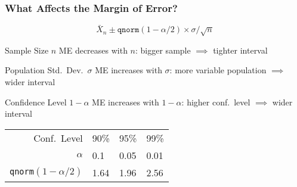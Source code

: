 \begin{frame}
\frametitle{What Affects the Margin of Error?}

	$$\boxed{\bar{X}_n \pm \texttt{qnorm}(1-\alpha/2) \times \sigma/\sqrt{n}}$$
 
  \small

	
\begin{block}{Sample Size $n$}
ME decreases with $n$: bigger sample $\implies$ tighter interval
\end{block}


\begin{block}{Population Std.\ Dev.\ $\sigma$}
ME increases with $\sigma$: more variable population $\implies$ wider interval
\end{block}



\begin{block}{Confidence Level $1-\alpha$}
ME increases with $1-\alpha$: higher conf.\ level $\implies$ wider interval

\pause

\vspace{1em}
	\begin{tabular}{r|lll}
	\hline
	Conf.\ Level & 90\% & 95\% & 99\% \\
	$\alpha$ & 0.1 & 0.05 & 0.01\\
	\texttt{qnorm}$(1-\alpha/2)$&1.64 & 1.96 & 2.56\\
	\hline
	\end{tabular}
\end{block}	
\end{frame}
